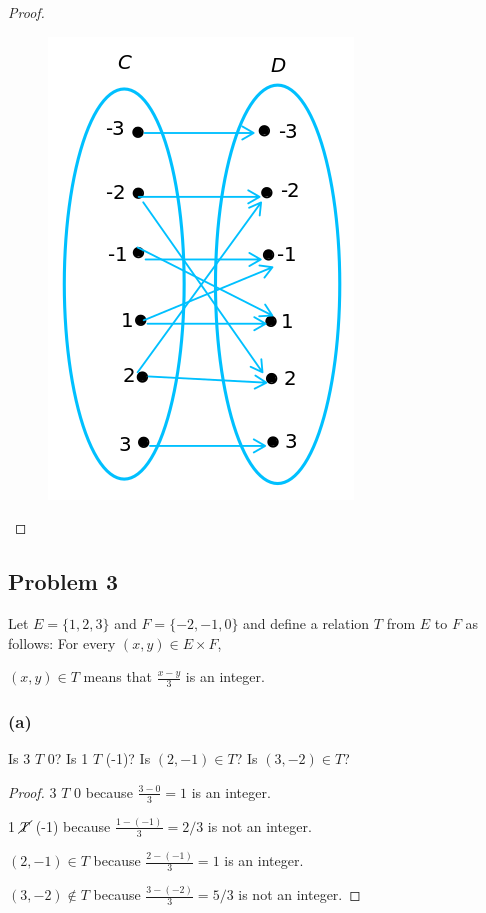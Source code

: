 \documentclass[14pt]{extarticle}
\newcommand{\dps}{\displaystyle}
\begin{document}
\begin{proof}
\begin{figure}[ht!]
\centering
\includegraphics[scale=0.5]{../images/1.3.2.png}
\end{figure}
\end{proof}

\subsection{Problem 3}
Let $E = \{1, 2, 3\}$ and $F = \{-2, -1, 0\}$ and define a relation $T$ from
$E$ to $F$ as follows: For every $(x, y) \in E \times F$,

\begin{center}
$(x, y) \in T$ means that $\dps\frac{x-y}{3}$ is an integer.
\end{center}

\subsubsection{(a)}
Is 3 $T$ 0? Is 1 $T$ (-1)? Is $(2, -1) \in T$? Is $(3, -2) \in T$?

\begin{proof}
3 $T$ 0 because $\dps\frac{3-0}{3} = 1$ is an integer.

1 $\cancel{T}$ (-1) because $\dps\frac{1-(-1)}{3} = 2/3$ is not an integer.

$(2, -1) \in T$ because $\dps\frac{2-(-1)}{3} = 1$ is an integer.

$(3, -2) \notin T$ because $\dps\frac{3-(-2)}{3} = 5/3$ is not an integer.
\end{proof}
\end{document}

